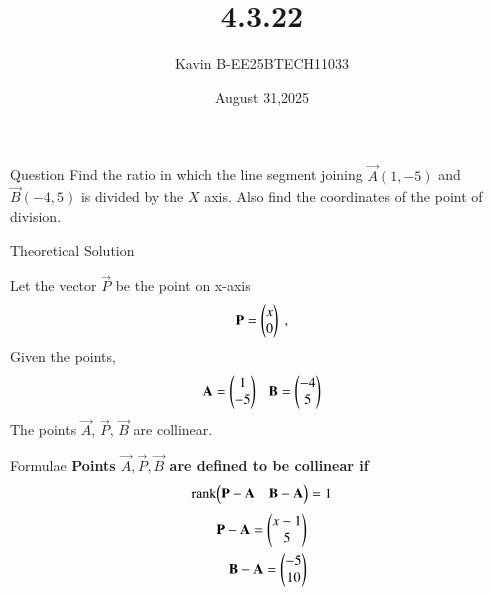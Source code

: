 \documentclass{beamer}
\begin{document}
\title 
{4.3.22}
\date{August 31,2025}


\author 
{Kavin B-EE25BTECH11033}






\frame{\titlepage}
\begin{frame}{Question}
Find the ratio in which the line segment joining $\vec{A}(1,-5)$  and  $\vec{B}(-4,5)$ is divided by the $X$ axis. Also find the coordinates of the point of division.\\
\end{frame}



\begin{frame}{Theoretical Solution}

Let the vector $\vec{P}$ be the point on x-axis
\begin{align}
    \vec{P}=\begin{myvec}{x\\0}\end{myvec} \;, 
\end{align}
Given the points,
\begin{align}
    \vec{A}=\begin{myvec}{1\\-5}\end{myvec}\ \ \ 
    \vec{B}=\begin{myvec}{-4\\5}\end{myvec}
\end{align}
\bigskip
The points $\vec{A}$, $\vec{P}$, $\vec{B}$ are collinear.\\

\end{frame}

\begin{frame}{Formulae}
\textbf{Points $\vec{A}, \vec{P}, \vec{B}$ are defined to be collinear if}
\begin{align}
		\label{eq:line-rank-2}
		\text{rank}{\ensuremath{\begin{pmatrix}\mathbf{P}-\mathbf{A}& \mathbf{B}-\mathbf{A}\end{pmatrix}}} = 1
\end{align}
\begin{align}
            \mathbf{P}-\mathbf{A} = \begin{pmatrix}x-1\\5\end{pmatrix}\\
            \mathbf{B}-\mathbf{A} = \begin{pmatrix}-5\\10\end{pmatrix}
\end{align}            
\end{frame}
\end{document}
